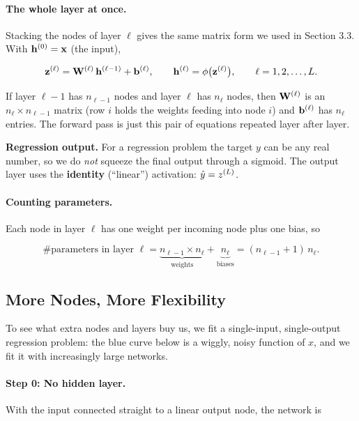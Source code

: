 \documentclass[12pt, a4paper]{article}
\begin{document}
\paragraph{The whole layer at once.}
Stacking the nodes of layer $\ell$ gives the same matrix form we used in
Section 3.3. With $\mathbf{h}^{(0)} = \mathbf{x}$ (the input),
\begin{resultbox}
  \[
    \mathbf{z}^{(\ell)} = \mathbf{W}^{(\ell)}\,\mathbf{h}^{(\ell-1)} + \mathbf{b}^{(\ell)},
    \qquad
    \mathbf{h}^{(\ell)} = \phi\bigl(\mathbf{z}^{(\ell)}\bigr),
    \qquad \ell = 1, 2, \dots, L.
  \]
\end{resultbox}
If layer $\ell-1$ has $n_{\ell-1}$ nodes and layer $\ell$ has $n_\ell$ nodes,
then $\mathbf{W}^{(\ell)}$ is an $n_\ell \times n_{\ell-1}$ matrix (row $i$ holds the
weights feeding into node $i$) and $\mathbf{b}^{(\ell)}$ has $n_\ell$ entries.
The forward pass is just this pair of equations repeated layer after layer.

\begin{notebox}
  \textbf{Regression output.} For a regression problem the target $y$ can be
  any real number, so we do \emph{not} squeeze the final output through a
  sigmoid. The output layer uses the \textbf{identity} (``linear'')
  activation: $\hat{y} = z^{(L)}$.
\end{notebox}

\paragraph{Counting parameters.}
Each node in layer $\ell$ has one weight per incoming node plus one bias, so
\begin{resultbox}
  \[
    \#\text{parameters in layer } \ell
    = \underbrace{n_{\ell-1} \times n_\ell}_{\text{weights}}
    + \underbrace{n_\ell}_{\text{biases}}
    = (n_{\ell-1} + 1)\, n_\ell .
  \]
\end{resultbox}

\subsection{More Nodes, More Flexibility}
\label{sec:flexibility}

To see what extra nodes and layers buy us, we fit a single-input,
single-output regression problem: the blue curve below is a wiggly,
noisy function of $x$, and we fit it with increasingly large networks.

\paragraph{Step 0: No hidden layer.}
With the input connected straight to a linear output node, the network is
\end{document}
